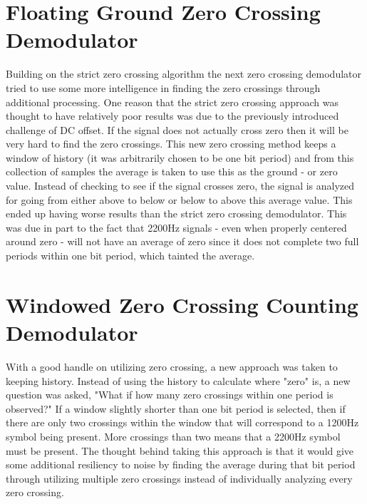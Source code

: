 \section{Floating Ground Zero Crossing Demodulator}
Building on the strict zero crossing algorithm the next zero crossing demodulator tried to use some more intelligence in finding the zero crossings through additional processing. One reason that the strict zero crossing approach was thought to have relatively poor results was due to the previously introduced challenge of DC offset. If the signal does not actually cross zero then it will be very hard to find the zero crossings. This new zero crossing method keeps a window of history (it was arbitrarily chosen to be one bit period) and from this collection of samples the average is taken to use this as the ground - or zero value. Instead of checking to see if the signal crosses zero, the signal is analyzed for going from either above to below or below to above this average value. This ended up having worse results than the strict zero crossing demodulator. This was due in part to the fact that 2200Hz signals - even when properly centered around zero - will not have an average of zero since it does not complete two full periods within one bit period, which tainted the average.

\section{Windowed Zero Crossing Counting Demodulator}
With a good handle on utilizing zero crossing, a new approach was taken to keeping history. Instead of using the history to calculate where "zero" is, a new question was asked, "What if how many zero crossings within one period is observed?" If a window slightly shorter than one bit period is selected, then if there are only two crossings within the window that will correspond to a 1200Hz symbol being present. More crossings than two means that a 2200Hz symbol must be present. The thought behind taking this approach is that it would give some additional resiliency to noise by finding the average during that bit period through utilizing multiple zero crossings instead of individually analyzing every zero crossing. 

